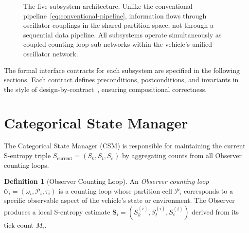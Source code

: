 \documentclass[twocolumn,10pt]{article}
\theoremstyle{definition}
\newtheorem{definition}[theorem]{Definition}
\newcommand{\Sentropy}{\mathbf{S}}
\newcommand{\Sk}{S_k}
\newcommand{\St}{S_t}
\newcommand{\Se}{S_e}
\newcommand{\Scurrent}{S_{\mathrm{current}}}
\begin{document}
\begin{figure}[t]
\centering
{}
\caption{The five-subsystem architecture. Unlike the conventional pipeline~\eqref{eq:conventional-pipeline}, information flows through oscillator couplings in the shared partition space, not through a sequential data pipeline. All subsystems operate simultaneously as coupled counting loop sub-networks within the vehicle's unified oscillator network.}
\label{fig:architecture}
\end{figure}

The formal interface contracts for each subsystem are specified in the following sections. Each contract defines preconditions, postconditions, and invariants in the style of design-by-contract~\cite{klein2009}, ensuring compositional correctness.


\section{Categorical State Manager}
\label{sec:csm}

The Categorical State Manager (CSM) is responsible for maintaining the current S-entropy triple $\Scurrent = (\Sk, \St, \Se)$ by aggregating counts from all Observer counting loops.

\begin{definition}[Observer Counting Loop]
\label{def:observer}
An \emph{Observer counting loop} $\mathcal{O}_i = (\omega_i, \mathcal{P}_i, \tau_i)$ is a counting loop whose partition cell $\mathcal{P}_i$ corresponds to a specific observable aspect of the vehicle's state or environment. The Observer produces a local S-entropy estimate $\Sentropy_i = (\Sk^{(i)}, \St^{(i)}, \Se^{(i)})$ derived from its tick count $M_i$.
\end{definition}
\end{document}
